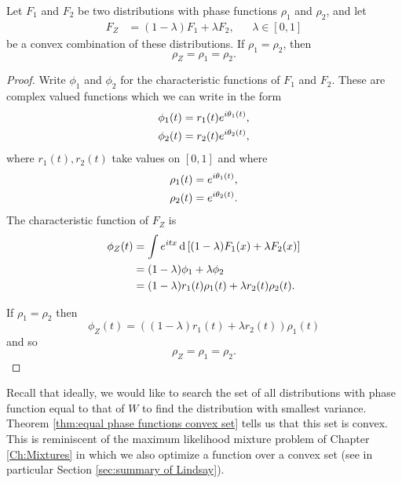 	\begin{theorem}
	\label{thm:equal phase functions convex set}
		Let $F_1$ and $F_2$ be two distributions with phase functions $\rho_1$ and $\rho_2$, and let
		\begin{align}
			F_Z &= (1 - \lambda) F_1 + \lambda F_2, && \lambda \in [0,1]
		\end{align}
		be a convex combination of these distributions. If $\rho_1 = \rho_2$, then 
		\begin{equation}
			\rho_Z = \rho_1 = \rho_2.
		\end{equation}
	\end{theorem}
	\begin{proof}
		Write $\phi_1$ and $\phi_2$ for the characteristic functions of $F_1$ and $F_2$. These are complex valued functions which we can write in the form
		\begin{align}
			\phi_1(t) &= r_1(t) e^{i\theta_1(t)},\\
			\phi_2(t) &= r_2(t) e^{i\theta_2(t)},
		\end{align}
		where $r_1(t), r_2(t)$ take values on $[0, 1]$ and where
		\begin{align}
			\rho_1(t) &= e^{i\theta_1(t)},\\
			\rho_2(t) &= e^{i\theta_2(t)}.
		\end{align}
		The characteristic function of $F_Z$ is 
		\begin{align}
			\phi_Z(t) &= \int e^{itx} \, \mathrm{d} \left[(1 - \lambda)F_1(x) + \lambda F_2(x)\right]\\
			&= (1 - \lambda)\phi_1 + \lambda \phi_2\\
			&= (1 - \lambda) r_1(t) \rho_1(t) + \lambda r_2(t) \rho_2(t).
		\end{align}

		If $\rho_1 = \rho_2$ then
		\begin{equation}
			\phi_Z(t) = \left((1 - \lambda)r_1(t) + \lambda r_2(t)\right) \rho_1(t)
		\end{equation}
		and so 
		\begin{equation}
			\rho_Z = \rho_1 = \rho_2.
		\end{equation}
	\end{proof}

Recall that ideally, we would like to search the set of all distributions with phase function equal to that of $W$ to find the distribution with smallest variance. Theorem \ref{thm:equal phase functions convex set} tells us that this set is convex. This is reminiscent of the maximum likelihood mixture problem of Chapter \ref{Ch:Mixtures} in which we also optimize a function over a convex set (see in particular Section \ref{sec:summary of Lindsay}).

